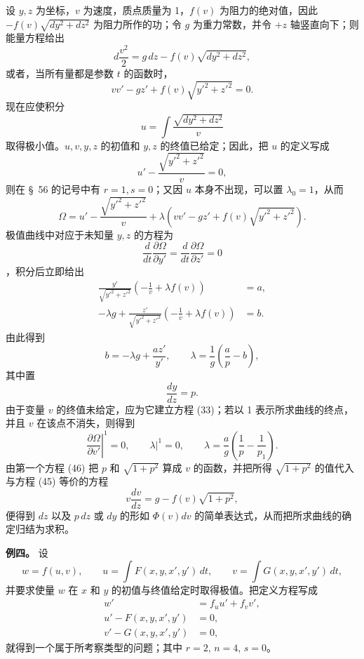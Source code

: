 \documentclass[11pt,a4paper,leqno]{article}
\begin{document}
设 $y,z$ 为坐标，$v$ 为速度，质点质量为 1，$f(v)$ 为阻力的绝对值，因此 $-f(v)\sqrt{dy^2+dz^2}$ 为阻力所作的功；令 $g$ 为重力常数，并令 $+z$ 轴竖直向下；则能量方程给出
\[
d\frac{v^2}{2}=g\,dz-f(v)\sqrt{dy^2+dz^2},
\]
或者，当所有量都是参数 $t$ 的函数时，
\begin{equation}\tag{45}
vv'-gz'+f(v)\sqrt{y'^2+z'^2}=0.
\end{equation}
现在应使积分
\[
u=\int\frac{\sqrt{dy^2+dz^2}}{v}
\]
取得极小值。$u,v,y,z$ 的初值和 $y,z$ 的终值已给定；因此，把 $u$ 的定义写成
\[
u'-\frac{\sqrt{y'^2+z'^2}}{v}=0,
\]
则在 \S~56 的记号中有 $r=1,s=0$；又因 $u$ 本身不出现，可以置 $\lambda_0=1$，从而
\[
\Omega=u'-\frac{\sqrt{y'^2+z'^2}}{v}
+\lambda\left(vv'-gz'+f(v)\sqrt{y'^2+z'^2}\right).
\]
极值曲线中对应于未知量 $y,z$ 的方程为
\[
\frac{d}{dt}\frac{\partial\Omega}{\partial y'}
=\frac{d}{dt}\frac{\partial\Omega}{\partial z'}=0
\]
，积分后立即给出
\begin{equation}\tag{46}
\begin{aligned}
\frac{y'}{\sqrt{y'^2+z'^2}}\left(-\frac1v+\lambda f(v)\right)&=a,\\
-\lambda g+\frac{z'}{\sqrt{y'^2+z'^2}}\left(-\frac1v+\lambda f(v)\right)&=b.
\end{aligned}
\end{equation}
由此得到
\[
b=-\lambda g+\frac{az'}{y'},\qquad
\lambda=\frac1g\left(\frac ap-b\right),
\]
其中置
\[
\frac{dy}{dz}=p.
\]
由于变量 $v$ 的终值未给定，应为它建立方程 (33)；若以 1 表示所求曲线的终点，并且 $v$ 在该点不消失，则得到
\[
\left.\frac{\partial\Omega}{\partial v'}\right|^1=0,\qquad
\left.\lambda\right|^1=0,\qquad
\lambda=\frac ag\left(\frac1p-\frac1{p_1}\right).
\]
由第一个方程 (46) 把 $p$ 和 $\sqrt{1+p^2}$ 算成 $v$ 的函数，并把所得 $\sqrt{1+p^2}$ 的值代入与方程 (45) 等价的方程
\[
v\frac{dv}{dz}=g-f(v)\sqrt{1+p^2},
\]
便得到 $dz$ 以及 $p\,dz$ 或 $dy$ 的形如 $\Phi(v)dv$ 的简单表达式，从而把所求曲线的确定归结为求积。

\noindent\textbf{例四。} 设
\[
w=f(u,v),\qquad
u=\int F(x,y,x',y')\,dt,\qquad
v=\int G(x,y,x',y')\,dt,
\]
并要求使量 $w$ 在 $x$ 和 $y$ 的初值与终值给定时取得极值。把定义方程写成
\[
\begin{aligned}
w'&=f_u u'+f_v v',\\
u'-F(x,y,x',y')&=0,\\
v'-G(x,y,x',y')&=0,
\end{aligned}
\]
就得到一个属于所考察类型的问题；其中 $r=2$, $n=4$, $s=0$。
\end{document}
